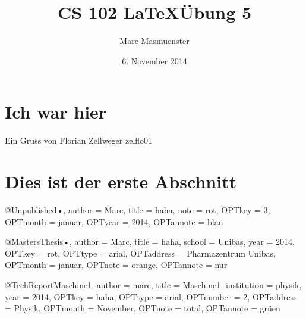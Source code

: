 \documentclass{article}
\author{Marc Masmuenster}
\title{CS 102 \LaTeX  \"Ubung 5}
\date{6. November 2014}
\begin{document}
\maketitle

\section{Ich war hier}
Ein Gruss von Florian Zellweger {zelflo01}

\section{Dies ist der erste Abschnitt}

@Unpublished{•,
author = {Marc},
title = {haha},
note = {rot},
OPTkey = {3},
OPTmonth = {januar},
OPTyear = {2014},
OPTannote = {blau}
}



@MastersThesis{•,
author = {Marc},
title = {haha},
school = {Unibas},
year = {2014},
OPTkey = {rot},
OPTtype = {arial},
OPTaddress = {Pharmazentrum Unibas},
OPTmonth = {januar},
OPTnote = {orange},
OPTannote = {nur}
}

@TechReport{Maschine1,
author = {marc},
title = {Maschine1},
institution = {physik},
year = {2014},
OPTkey = {haha},
OPTtype = {arial},
OPTnumber = {2},
OPTaddress = {Physik},
OPTmonth = {November},
OPTnote = {total},
OPTannote = {grüen}
}
\end{document}
